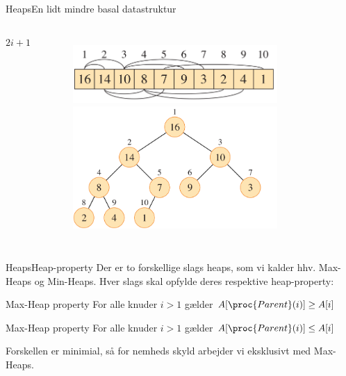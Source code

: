 \documentclass[aspectratio=1610]{beamer}
\begin{document}
\begin{frame}{Heaps}{En lidt mindre basal datastruktur}
\begin{columns}
{\begin{block}
                \begin{codebox}
                    \li \Return $2i + 1$
                \end{codebox}
            \end{block}
        }
    
        \begin{figure}[h]
            \centering
            \includegraphics[width=0.8\textwidth]{heaps/array}
            \includegraphics[width=0.8\textwidth]{heaps/tree}
        \end{figure}
    \end{columns}
\end{frame}


\begin{frame}{Heaps}{Heap-property}
    Der er to forskellige slags heaps, som vi kalder hhv. \alert{Max-Heaps} og
    \alert{Min-Heaps}. Hver slags skal opfylde deres respektive
    \alert{heap-property}:

    \begin{block}{Max-Heap property}
        For alle knuder $i > 1$ gælder $A[\proc{Parent}(i)] \geq A[i]$
    \end{block}

    \pause
    \begin{block}{Max-Heap property}
        For alle knuder $i > 1$ gælder $A[\proc{Parent}(i)] \leq A[i]$
    \end{block}

    \pause
    Forskellen er minimial, så for nemheds skyld arbejder vi eksklusivt med
    Max-Heaps.
\end{frame}
\end{document}
